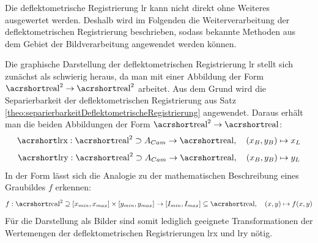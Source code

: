 Die deflektometrische Registrierung \acrshort{lr} kann nicht direkt ohne Weiteres ausgewertet werden.
Deshalb wird im Folgenden die Weiterverarbeitung der deflektometrischen Registrierung beschrieben, sodass bekannte Methoden aus dem Gebiet der Bildverarbeitung angewendet werden können.

\p
Die graphische Darstellung der deflektometrischen Registrierung \acrshort{lr} stellt sich zunächst als schwierig heraus, da man mit einer Abbildung der Form $\acrshortmath{real}^2 \rightarrow \acrshortmath{real}^2$ arbeitet.
Aus dem Grund wird die Separierbarkeit der deflektometrischen Registrierung aus Satz \ref{theo:separierbarkeitDeflektometrischeRegistrierung} angewendet.
Daraus erhält man die beiden Abbildungen der Form $\acrshortmath{real}^2 \rightarrow \acrshortmath{real}$:
%
\begin{equation*}
	\acrshortmath{lrx} : \acrshortmath{real}^{2} \supset A_{Cam} \rightarrow \acrshortmath{real} ,\quad (x_{B}, y_{B}) \mapsto x_{L}
\end{equation*}
%
\begin{equation*}
	\acrshortmath{lry} : \acrshortmath{real}^{2} \supset A_{Cam} \rightarrow \acrshortmath{real} ,\quad (x_{B}, y_{B}) \mapsto y_{L}
\end{equation*}
%
In der Form lässt sich die Analogie zu der mathematischen Beschreibung eines Graubildes $f$ erkennen:
%
\begin{equation*}
	f : \acrshortmath{real}^{2} \supseteq [x_{min},x_{max}] \times [y_{min},y_{max}] \rightarrow [I_{min},I_{max}] \subseteq \acrshortmath{real} ,\quad (x,y) \mapsto f(x,y)
\end{equation*}
%
Für die Darstellung als Bilder sind somit lediglich geeignete Transformationen der Wertemengen der deflektometrischen Registrierungen \acrshort{lrx} und \acrshort{lry} nötig.
%
